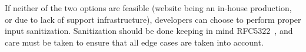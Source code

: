 If neither of the two options are feasible (website being an in-house
production, or due to lack of support infrastructure), developers can
choose to perform proper input sanitization. Sanitization should be
done keeping in mind RFC5322~\cite{rfc5322}, and care must be taken to
ensure that all edge cases are taken into account.
	

